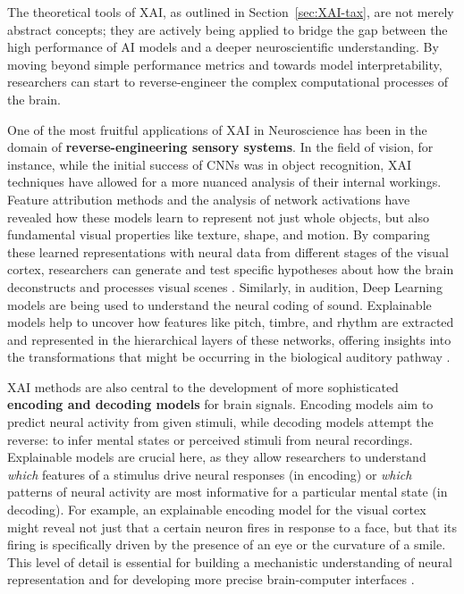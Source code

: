 The theoretical tools of XAI, as outlined in Section~\ref{sec:XAI-tax}, are not merely abstract concepts; they are actively being applied to bridge the gap between the high performance of AI models and a deeper neuroscientific understanding. By moving beyond simple performance metrics and towards model interpretability, researchers can start to reverse-engineer the complex computational processes of the brain.

One of the most fruitful applications of XAI in Neuroscience has been in the domain of \textbf{reverse-engineering sensory systems}. In the field of vision, for instance, while the initial success of CNNs was in object recognition, XAI techniques have allowed for a more nuanced analysis of their internal workings. Feature attribution methods and the analysis of network activations have revealed how these models learn to represent not just whole objects, but also fundamental visual properties like texture, shape, and motion. By comparing these learned representations with neural data from different stages of the visual cortex, researchers can generate and test specific hypotheses about how the brain deconstructs and processes visual scenes \cite{yamins2016using, kriegeskorte2018cognitive}. Similarly, in audition, Deep Learning models are being used to understand the neural coding of sound. Explainable models help to uncover how features like pitch, timbre, and rhythm are extracted and represented in the hierarchical layers of these networks, offering insights into the transformations that might be occurring in the biological auditory pathway \cite{richards2019deep}.

XAI methods are also central to the development of more sophisticated \textbf{encoding and decoding models} for brain signals. Encoding models aim to predict neural activity from given stimuli, while decoding models attempt the reverse: to infer mental states or perceived stimuli from neural recordings. Explainable models are crucial here, as they allow researchers to understand \textit{which} features of a stimulus drive neural responses (in encoding) or \textit{which} patterns of neural activity are most informative for a particular mental state (in decoding). For example, an explainable encoding model for the visual cortex might reveal not just that a certain neuron fires in response to a face, but that its firing is specifically driven by the presence of an eye or the curvature of a smile. This level of detail is essential for building a mechanistic understanding of neural representation and for developing more precise brain-computer interfaces \cite{schrimpf2020brain}.

